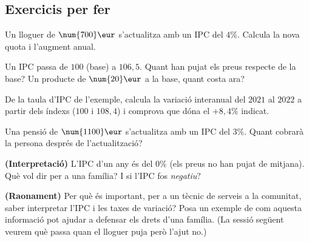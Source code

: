 \subsection{Exercicis per fer}

\begin{exercicis}
\begin{exlist}
  \item Un lloguer de $\num{700}\eur$ s'actualitza amb un IPC del $4\%$. Calcula la
        nova quota i l'augment anual.
  \item Un IPC passa de $100$ (base) a $106,5$. Quant han pujat els preus respecte de
        la base? Un producte de $\num{20}\eur$ a la base, quant costa ara?
  \item De la taula d'IPC de l'exemple, calcula la variació interanual del $2021$ al
        $2022$ a partir dels índexs ($100$ i $108,4$) i comprova que dóna el $+8,4\%$
        indicat.
  \item Una pensió de $\num{1100}\eur$ s'actualitza amb un IPC del $3\%$. Quant cobrarà
        la persona després de l'actualització?
  \item \textbf{(Interpretació)} L'IPC d'un any és del $0\%$ (els preus no han pujat de
        mitjana). Què vol dir per a una família? I si l'IPC fos \emph{negatiu}?
  \item \textbf{(Raonament)} Per què és important, per a un tècnic de serveis a la
        comunitat, saber interpretar l'IPC i les taxes de variació? Posa un exemple de
        com aquesta informació pot ajudar a defensar els drets d'una família. (La
        sessió següent veurem què passa quan el lloguer puja però l'ajut no.)
\end{exlist}
\end{exercicis}

